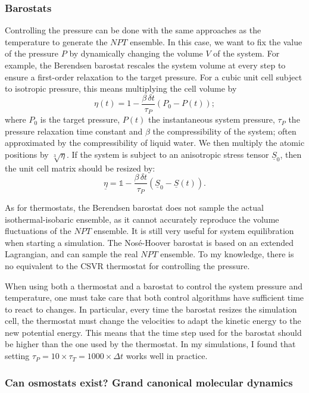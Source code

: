 \documentclass[thesis]{subfiles}
\begin{document}
\subsubsection{Barostats}

Controlling the pressure can be done with the same approaches as the temperature
to generate the $NPT$ ensemble. In this case, we want to fix the value of the
pressure $P$ by dynamically changing the volume $V$ of the system. For example,
the Berendsen barostat\cite{Berendsen1984} rescales the system volume at every
step to ensure a first-order relaxation to the target pressure. For a cubic unit
cell subject to isotropic pressure, this means multiplying the cell volume by
\[ \eta(t) = 1 - \frac{\beta\,\delta t}{\tau_P} \left(P_0 - P(t)\right);\]
where $P_0$ is the target pressure, $P(t)$ the instantaneous system pressure,
$\tau_P$ the pressure relaxation time constant and $\beta$ the compressibility
of the system; often approximated by the compressibility of liquid water. We
then multiply the atomic positions by $\sqrt[3]{\eta}$. If the system is subject
to an anisotropic stress tensor $\underline{S}_0$, then the unit cell matrix
should be resized by:
\[ \underline{\eta} = \mathds{1} - \frac{\beta\,\delta t}{\tau_P} \left(\underline{S}_0 - \underline{S}(t)\right). \]

As for thermostats, the Berendsen barostat does not sample the actual
isothermal-isobaric ensemble, as it cannot accurately reproduce the volume
fluctuations of the $NPT$ ensemble. It is still very useful for system
equilibration when starting a simulation. The Nosé-Hoover barostat is based on
an extended Lagrangian, and can sample the real $NPT$
ensemble\cite{Tuckerman2010}. To my knowledge, there is no equivalent to the
CSVR thermostat for controlling the pressure.

When using both a thermostat and a barostat to control the system pressure and
temperature, one must take care that both control algorithms have sufficient
time to react to changes. In particular, every time the barostat resizes the
simulation cell, the thermostat must change the velocities to adapt the kinetic
energy to the new potential energy. This means that the time step used for the
barostat should be higher than the one used by the thermostat. In my
simulations, I found that setting $\tau_P = 10 \times \tau_T = 1000 \times \Delta
t$ works well in practice.

\subsubsection{Can osmostats exist? Grand canonical molecular dynamics}
\label{sec:gcmd}
\end{document}
